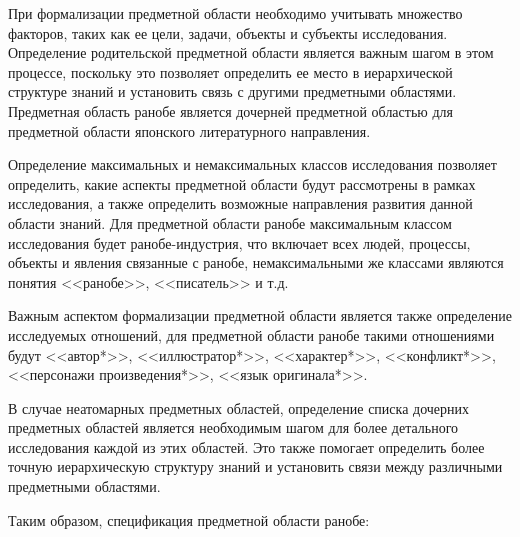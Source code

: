 При формализации предметной области необходимо учитывать множество факторов, таких как ее цели, задачи, объекты и субъекты исследования. Определение родительской предметной области является важным шагом в этом процессе, поскольку это позволяет определить ее место в иерархической структуре знаний и установить связь с другими предметными областями. Предметная область ранобе является дочерней предметной областью для предметной области японского литературного направления.

Определение максимальных и немаксимальных классов исследования позволяет определить, какие аспекты предметной области будут рассмотрены в рамках исследования, а также определить возможные направления развития данной области знаний. Для предметной области ранобе максимальным классом исследования будет ранобе-индустрия, что включает всех людей, процессы, объекты и явления связанные с ранобе, немаксимальными же классами являются понятия <<ранобе>>, <<писатель>> и т.д.

Важным аспектом формализации предметной области является также определение исследуемых отношений, для предметной области ранобе такими отношениями будут <<автор*>>, <<иллюстратор*>>, <<характер*>>, <<конфликт*>>, <<персонажи произведения*>>, <<язык оригинала*>>.

В случае неатомарных предметных областей, определение списка дочерних предметных областей является необходимым шагом для более детального исследования каждой из этих областей. Это также помогает определить более точную иерархическую структуру знаний и установить связи между различными предметными областями.

Таким образом, спецификация предметной области ранобе:

